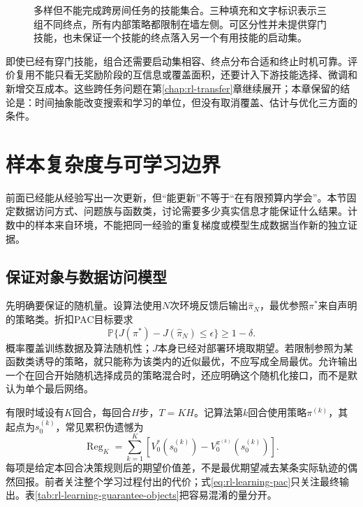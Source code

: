 \begin{figure}[t]
  \centering
  
  \caption{多样但不能完成跨房间任务的技能集合。三种填充和文字标识表示三组不同终点，所有内部策略都限制在墙左侧。可区分性并未提供穿门技能，也未保证一个技能的终点落入另一个有用技能的启动集。}
  \label{fig:rl-learning-skill-regions}
\end{figure}

即使已经有穿门技能，组合还需要启动集相容、终点分布合适和终止时机可靠。评价复用不能只看无奖励阶段的互信息或覆盖面积，还要计入下游技能选择、微调和新增交互成本。这些跨任务问题在第\ref{chap:rl-transfer}章继续展开；本章保留的结论是：时间抽象能改变搜索和学习的单位，但没有取消覆盖、估计与优化三方面的条件。

\section{样本复杂度与可学习边界}
\label{sec:rl-learning-statistical-limits}

前面已经能从经验写出一次更新，但“能更新”不等于“在有限预算内学会”。本节固定数据访问方式、问题族与函数类，讨论需要多少真实信息才能保证什么结果。计数中的样本来自环境，不能把同一经验的重复梯度或模型生成数据当作新的独立证据。

\subsection{保证对象与数据访问模型}
\label{sec:rl-learning-guarantees-access}

先明确要保证的随机量。设算法使用$N$次环境反馈后输出$\widehat\pi_N$，最优参照$\pi^*$来自声明的策略类。折扣PAC目标要求
\begin{equation}
 \mathbb P\{J(\pi^*)-J(\widehat\pi_N)\leq\epsilon\}
                       \geq1-\delta.
 \label{eq:rl-learning-pac}
\end{equation}
概率覆盖训练数据及算法随机性；$J$本身已经对部署环境取期望。若限制参照为某函数类诱导的策略，就只能称为该类内的近似最优，不应写成全局最优。允许输出一个在回合开始随机选择成员的策略混合时，还应明确这个随机化接口，而不是默认为单个最后网络。

有限时域设有$K$回合，每回合$H$步，$T=KH$。记算法第$k$回合使用策略$\pi^{(k)}$，其起点为$s_0^{(k)}$，常见累积伪遗憾为
\begin{equation}
 \operatorname{Reg}_K
   =\sum_{k=1}^{K}\left[
       V_0^*(s_0^{(k)})-V_0^{\pi^{(k)}}(s_0^{(k)})\right].
 \label{eq:rl-learning-episodic-regret}
\end{equation}
每项是给定本回合决策规则后的期望价值差，不是最优期望减去某条实际轨迹的偶然回报。前者关注整个学习过程付出的代价；式\eqref{eq:rl-learning-pac}只关注最终输出。表\ref{tab:rl-learning-guarantee-objects}把容易混淆的量分开。

